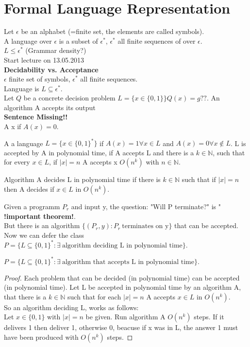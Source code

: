 \section{Formal Language Representation}
Let $\epsilon$ be an alphabet (=finite set, the elements are called symbols).\\
A language over $\epsilon$ is a subset of $\epsilon^*$, $\epsilon^*$ all finite sequences of over $\epsilon$.\\
$L \leq \epsilon^*$ (Grammar density?)\\
\newline
Start lecture on 13.05.2013\\
\newline
\textbf{Decidability vs. Acceptance}\\
$\epsilon$ finite set of symbols, $\epsilon^*$ all finite sequences.\\
Language is $L \subseteq \epsilon^*$. \\
Let $Q$ be a concrete decision problem $L = \{ x \in \{ 0,1 \} \} Q(x) = g??$. An algorithm A accepts its output\\
\textbf{Sentence Missing!!} \\
A  x if $A(x) = 0$.

A  a language $L = \{ x \in \{ 0,1 \}^* \}$ if $A(x) = 1 \forall x \in L$ and $A(x) = 0 \forall x \not\in L$. L is accepted by A in polynomial time, if A accepts L and there is a $k \in \mathbb{N}$, such that for every $x \in L$, if $\left| x \right| = n$ A accepts x $O(n^k)$ with $n \in \mathbb{N}$. 

Algorithm A decides L in polynomial time if there is $k \in \mathbb{N}$ such that if $\left| x \right| = n$ then A decides if $x \in L$ in $O(n^k)$.

Given a programm $P_{r}$ and input y, the question: "Will P terminate?" is " \textbf{!important theorem!}.\\
But there is an algorithm $\{(P_{r},y):P_{r} ~ \text{terminates on y} \}$ that can be accepted. \\
Now we can defer the class $P=\{ L \subseteq \{ 0,1 \}^*: \exists ~\text{algorithm deciding L in polynomial time} \}$.

\begin{lemma}
  $P=\{ L \subseteq \{ 0,1 \}^*: \exists ~\text{algorithm that accepts L in polynomial time} \}$.
\end{lemma}

\begin{proof}
  Each problem that can be decided (in polynomial time) can be accepted (in polynomial time). Let L be accepted in polynomial time
  by an algorithm A, that there is a $k \in \mathbb{N}$ such that for each $\left| x \right| = n$ A accepts $x \in L$ in $O(n^k)$.\\
  So an algorithm deciding L, works as follows:\\
  Let $x \in \{ 0,1 \}$ with $\left| x \right| = n$ be given. Run algorithm A $O(n^k)$ steps. If it delivers 1 then deliver 1,
  otherwise 0, beacuse if x was in L, the answer 1 must have been produced with $O(n^k)$ steps.
\end{proof}


